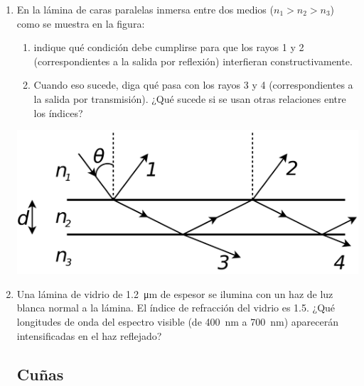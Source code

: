 \documentclass[11pt,spanish,a4paper]{article}
\begin{document}
\begin{enumerate}
\item
\begin{minipage}[t]{0.7\textwidth}
En la lámina de caras paralelas inmersa entre dos medios (\(n_1> n_2 > n_3\)) como se muestra en la figura:
\begin{enumerate}
	\item indique qué condición debe cumplirse para que los rayos \num{1} y \num{2} (correspondientes a la salida por reflexión) interfieran constructivamente.
	\item Cuando eso sucede, diga qué pasa con los rayos \num{3} y \num{4} (correspondientes a la salida por transmisión). ¿Qué sucede si se usan otras relaciones entre los índices?
\end{enumerate}
\end{minipage}
\begin{minipage}[c][1em][t]{0.25\textwidth}
	\includegraphics[width=\textwidth]{ej5-21}
\end{minipage}




\item
Una lámina de vidrio de \SI{1.2}{\micro\metre} de espesor se ilumina con un haz de luz blanca normal a la lámina.
El índice de refracción del vidrio es \num{1.5}.
¿Qué longitudes de onda del espectro visible (de \SI{400}{\nano\metre} a \SI{700}{\nano\metre}) aparecerán intensificadas en el haz reflejado?


\subsection*{Cuñas}


\end{enumerate}
\end{document}
